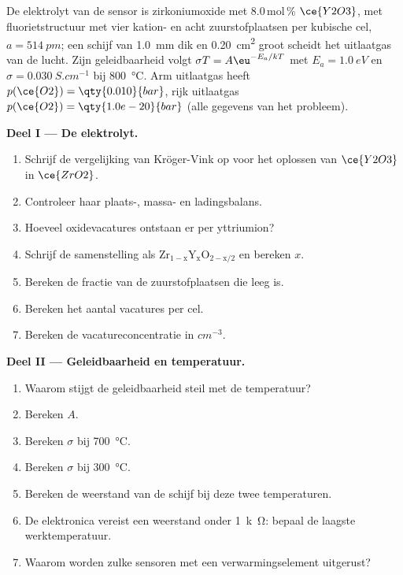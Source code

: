 \begin{problem}
\label{pb:b3:solid-state:1}
De elektrolyt van de sensor is zirkoniumoxide met 8.0\,mol\,\% $\ce{Y2O3}$, met fluorietstructuur
met vier kation- en acht zuurstofplaatsen per kubische cel, $a = \qty{514}{pm}$; een schijf
van \qty{1.0}{mm} dik en \qty{0.20}{cm^2} groot scheidt het uitlaatgas van
de lucht. Zijn
geleidbaarheid volgt $\sigma T = A\eu^{-E_a/kT}$ met $E_a = \qty{1.0}{eV}$ en $\sigma = \qty{0.030}{S.cm^{-1}}$ bij \qty{800}{\celsius}. Arm
uitlaatgas heeft $p(\ce{O2}) = \qty{0.010}{bar}$, rijk uitlaatgas $p(\ce{O2}) = \qty{1.0e-20}{bar}$ (alle gegevens van het probleem).

\medskip\noindent\textbf{Deel I --- De elektrolyt.}
\begin{enumerate}
  \item Schrijf de vergelijking van Kröger-Vink op voor het oplossen van $\ce{Y2O3}$ in $\ce{ZrO2}$.
  \item Controleer haar plaats-, massa- en ladingsbalans.
  \item Hoeveel oxidevacatures ontstaan er per yttriumion?
  \item Schrijf de samenstelling als $\mathrm{Zr_{1-x}Y_xO_{2-x/2}}$ en bereken $x$.
  \item Bereken de fractie van de zuurstofplaatsen die leeg is.
  \item Bereken het aantal vacatures per cel.
  \item Bereken de vacatureconcentratie in $\unit{cm^{-3}}$.
\end{enumerate}

\medskip\noindent\textbf{Deel II --- Geleidbaarheid en temperatuur.}
\begin{enumerate}[resume]
  \item Waarom stijgt de geleidbaarheid steil met de temperatuur?
  \item Bereken $A$.
  \item Bereken $\sigma$ bij \qty{700}{\celsius}.
  \item Bereken $\sigma$ bij \qty{300}{\celsius}.
  \item Bereken de weerstand van de schijf bij deze twee temperaturen.
  \item De elektronica vereist een weerstand onder \qty{1}{k\ohm}: bepaal
        de laagste werktemperatuur.
  \item Waarom worden zulke sensoren met een verwarmingselement uitgerust?
\end{enumerate}


\end{problem}
